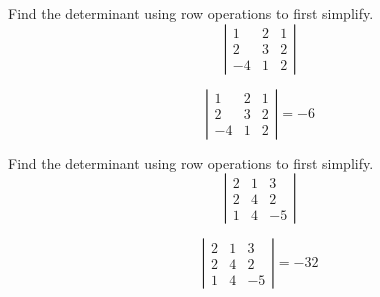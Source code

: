 \begin{enumialphparenastyle}

\begin{ex} Find the determinant using row operations to first simplify. 
\begin{equation*}
\left|
\begin{array}{rrr}
1 & 2 & 1 \\
2 & 3 & 2 \\
-4 & 1 & 2
\end{array}
\right|
\end{equation*}
\begin{sol}
\[
\left|
\begin{array}{rrr}
1 & 2 & 1 \\
2 & 3 & 2 \\
-4 & 1 & 2
\end{array}
\right| = -6
\]
\end{sol}
\end{ex}

\begin{ex} Find the determinant using row operations to first simplify.
\begin{equation*}
\left|
\begin{array}{rrr}
2 & 1 & 3 \\
2 & 4 & 2 \\
1 & 4 & -5
\end{array}
\right|
\end{equation*}
\begin{sol}
\[
\left|
\begin{array}{rrr}
2 & 1 & 3 \\
2 & 4 & 2 \\
1 & 4 & -5
\end{array}
\right| = -32
\]
\end{sol}
\end{ex}


\end{enumialphparenastyle}
